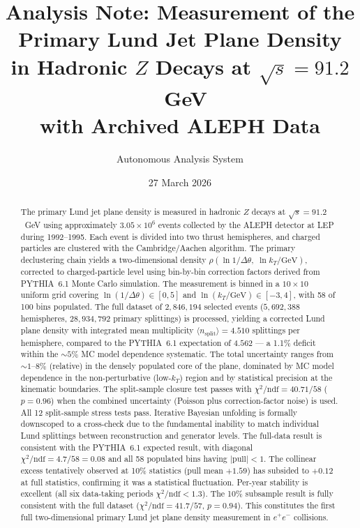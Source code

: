 \documentclass[11pt,a4paper]{article}
\title{Analysis Note: Measurement of the Primary Lund Jet Plane Density\\
in Hadronic $Z$ Decays at $\sqrt{s} = 91.2$~GeV\\
with Archived ALEPH Data}
\author{Autonomous Analysis System}
\date{27 March 2026}
\begin{document}
\maketitle

\begin{abstract}
The primary Lund jet plane density is measured in hadronic $Z$ decays
at $\sqrt{s} = 91.2$~GeV using approximately $3.05 \times 10^6$
events collected by the ALEPH detector at LEP during 1992--1995.
Each event is divided into two thrust hemispheres, and charged
particles are clustered with the Cambridge/Aachen algorithm.
The primary declustering chain yields a two-dimensional density
$\rho(\ln 1/\Delta\theta,\;\ln k_T/\text{GeV})$, corrected to
charged-particle level using bin-by-bin correction factors derived
from PYTHIA~6.1 Monte Carlo simulation.  The measurement is binned in a
$10 \times 10$ uniform grid covering $\ln(1/\Delta\theta) \in [0, 5]$
and $\ln(k_T/\text{GeV}) \in [-3, 4]$, with 58 of 100 bins
populated.  The full dataset of $2{,}846{,}194$ selected events
($5{,}692{,}388$ hemispheres, $28{,}934{,}792$ primary splittings)
is processed, yielding a corrected Lund plane density with integrated
mean multiplicity $\langle n_\text{split} \rangle = 4.510$ splittings
per hemisphere, compared to the PYTHIA~6.1 expectation of $4.562$
--- a 1.1\% deficit within the $\sim\!5\%$ MC model dependence
systematic.  The total uncertainty ranges from $\sim\!1$--$8\%$
(relative) in the densely populated core of the plane, dominated by
MC model dependence in the non-perturbative (low-$k_T$) region and by
statistical precision at the kinematic boundaries.  The split-sample
closure test passes with $\chi^2/\text{ndf} = 40.71/58$ ($p = 0.96$)
when the combined uncertainty (Poisson plus correction-factor noise)
is used.  All 12 split-sample stress tests pass.  Iterative Bayesian
unfolding is formally downscoped to a cross-check due to the
fundamental inability to match individual Lund splittings between
reconstruction and generator levels.  The full-data result is
consistent with the PYTHIA~6.1 expected result, with diagonal
$\chi^2/\text{ndf} = 4.7/58 = 0.08$ and all 58 populated bins
having $|\text{pull}| < 1$.  The collinear excess tentatively observed
at 10\% statistics (pull mean $+1.59$) has subsided to $+0.12$ at
full statistics, confirming it was a statistical fluctuation.
Per-year stability is excellent (all six data-taking periods
$\chi^2/\text{ndf} < 1.3$).  The 10\% subsample result is fully
consistent with the full dataset ($\chi^2/\text{ndf} = 41.7/57$,
$p = 0.94$).  This constitutes the first full two-dimensional primary
Lund jet plane density measurement in $e^+e^-$ collisions.
\end{abstract}
\end{document}
